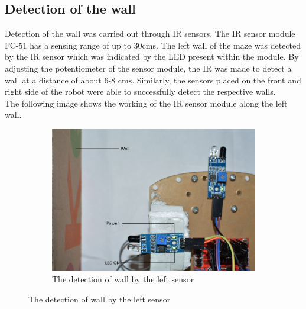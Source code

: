 \subsection{Detection of the wall}
Detection of the wall was carried out through IR sensors. The IR sensor module FC-51 has a sensing range of up to 30cms. The left wall of the maze was detected by the IR sensor which was indicated by the LED present within the module. By adjusting the potentiometer of the sensor module, the IR was made to detect a wall at a distance of about 6-8 cms. Similarly, the sensors placed on the front and right side of the robot were able to successfully detect the respective walls.\\
The following image shows the working of the IR sensor module along the left wall.\\
\newpage
\begin{figure}[h]
       \begin{center}
       
       \begin{subfigure}[b]{0.5\textwidth}
                 \includegraphics[scale=0.21]{part3_1_lb.jpg} 
                \caption{The detection of wall by the left sensor}
                

\end{subfigure}
\end{center}
\end{figure}
